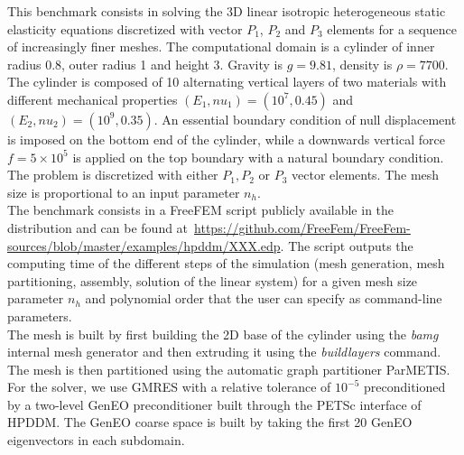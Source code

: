 This benchmark consists in solving the 3D linear isotropic heterogeneous static elasticity equations discretized with vector $P_1$, $P_2$ and $P_3$ elements for a sequence of increasingly finer meshes. The computational domain is a cylinder of inner radius 0.8, outer radius 1 and height 3. Gravity is $g = 9.81$, density is $\rho = 7700$. The cylinder is composed of 10 alternating vertical layers of two materials with different mechanical properties $(E_1, nu_1) = (10^7, 0.45)$ and $(E_2, nu_2) = (10^9, 0.35)$. An essential boundary condition of null displacement is imposed on the bottom end of the cylinder, while a downwards vertical force $f = 5 \times 10^5$ is applied on the top boundary with a natural boundary condition.\\
The problem is discretized with either $P_1, P_2$ or $P_3$ vector elements. The mesh size is proportional to an input parameter ${n}_h$.\\

The benchmark consists in a FreeFEM script publicly available in the distribution and can be found at~\url{https://github.com/FreeFem/FreeFem-sources/blob/master/examples/hpddm/XXX.edp}. The script outputs the computing time of the different steps of the simulation (mesh generation, mesh partitioning, assembly, solution of the linear system) for a given mesh size parameter ${n}_h$ and polynomial order that the user can specify as command-line parameters.\\

The mesh is built by first building the 2D base of the cylinder using the \textit{bamg} internal mesh generator and then extruding it using the \textit{buildlayers} command. The mesh is then partitioned using the automatic graph partitioner ParMETIS. For the solver, we use GMRES with a relative tolerance of $10^{-5}$ preconditioned by a two-level GenEO preconditioner built through the PETSc interface of HPDDM. The GenEO coarse space is built by taking the first 20 GenEO eigenvectors in each subdomain.


